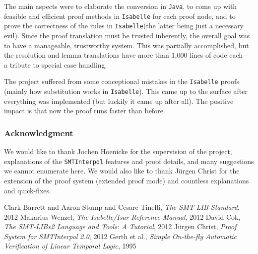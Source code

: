 \documentclass[10pt,a4paper]{article}
\newcommand{\si}{\texttt{SMTInterpol}\xspace}
\newcommand{\isa}{\texttt{Isabelle}\xspace}
\newcommand{\jav}{\texttt{Java}\xspace}
\begin{document}
The main aspects were to elaborate the conversion in \jav, to come up with feasible and efficient proof methods in \isa for each proof node, and to prove the correctness of the rules in \isa (the latter being just a necessary evil). Since the proof translation must be trusted inherently, the overall goal was to have a manageable, trustworthy system. This was partially accomplished, but the resolution and lemma translations have more than 1{,}000 lines of code each -- a tribute to special case handling.

The project suffered from some conceptional mistakes in the \isa proofs (mainly how substitution works in \isa). This came up to the surface after everything was implemented (but luckily it came up after all). The positive impact is that now the proof runs faster than before.
%
\subsubsection*{Acknowledgment}

We would like to thank Jochen Hoenicke for the supervision of the project, explanations of the \si features and proof details, and many suggestions we cannot enumerate here. We would also like to thank J\"urgen Christ for the extension of the proof system (extended proof mode) and countless explanations and quick-fixes.
%
%

\begin{thebibliography}{100}
Clark Barrett and Aaron Stump and Cesare Tinelli, \emph{The SMT-LIB Standard}, 2012
Makarius Wenzel, \emph{The Isabelle/Isar Reference Manual}, 2012
David Cok, \emph{The SMT-LIBv2 Language and Tools: A Tutorial}, 2012
J\"urgen Christ, \emph{Proof System for SMTInterpol 2.0}, 2012
Gerth et al., \emph{Simple On-the-fly Automatic Verification of Linear Temporal Logic}, 1995
\end{thebibliography}
\end{document}
